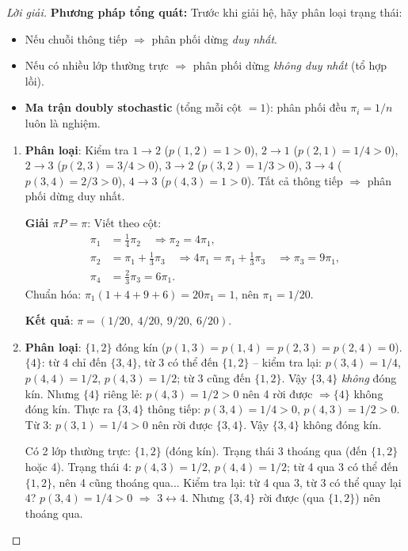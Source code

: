 \documentclass[8pt,a4paper]{article}
\newenvironment{solution}{\begin{proof}[Lời giải]}{\end{proof}}
\begin{document}
\begin{solution}
\textbf{Phương pháp tổng quát:} Trước khi giải hệ, hãy phân loại trạng thái:
\begin{itemize}
  \item Nếu chuỗi thông tiếp $\Rightarrow$ phân phối dừng \emph{duy nhất}.
  \item Nếu có nhiều lớp thường trực $\Rightarrow$ phân phối dừng \emph{không duy nhất} (tổ hợp lồi).
  \item \textbf{Ma trận doubly stochastic} (tổng mỗi cột $= 1$): phân phối đều $\pi_i = 1/n$ luôn là nghiệm.
\end{itemize}

\begin{enumerate}[label=(\alph*)]
\item \textbf{Phân loại}: Kiểm tra $1\to 2$ ($p(1,2)=1>0$), $2\to 1$ ($p(2,1)=1/4>0$), $2\to 3$ ($p(2,3)=3/4>0$), $3\to 2$ ($p(3,2)=1/3>0$), $3\to 4$ ($p(3,4)=2/3>0$), $4\to 3$ ($p(4,3)=1>0$). Tất cả thông tiếp $\Rightarrow$ phân phối dừng duy nhất.

\textbf{Giải $\pi P = \pi$}: Viết theo cột:
\begin{align*}
  \pi_1 &= \tfrac{1}{4}\pi_2 \quad \Rightarrow \pi_2 = 4\pi_1, \\
  \pi_2 &= \pi_1 + \tfrac{1}{3}\pi_3 \quad \Rightarrow 4\pi_1 = \pi_1 + \tfrac{1}{3}\pi_3 \quad \Rightarrow \pi_3 = 9\pi_1, \\
  \pi_4 &= \tfrac{2}{3}\pi_3 = 6\pi_1.
\end{align*}
Chuẩn hóa: $\pi_1(1+4+9+6) = 20\pi_1 = 1$, nên $\pi_1 = 1/20$.

\textbf{Kết quả}: $\pi = (1/20,\ 4/20,\ 9/20,\ 6/20)$.

\item \textbf{Phân loại}: $\{1,2\}$ đóng kín ($p(1,3)=p(1,4)=p(2,3)=p(2,4)=0$). $\{4\}$: từ 4 chỉ đến $\{3,4\}$, từ 3 có thể đến $\{1,2\}$ -- kiểm tra lại: $p(3,4)=1/4$, $p(4,4)=1/2$, $p(4,3)=1/2$; từ 3 cũng đến $\{1,2\}$. Vậy $\{3,4\}$ \emph{không} đóng kín. Nhưng $\{4\}$ riêng lẻ: $p(4,3)=1/2>0$ nên 4 rời được $\Rightarrow \{4\}$ không đóng kín. Thực ra $\{3,4\}$ thông tiếp: $p(3,4)=1/4>0$, $p(4,3)=1/2>0$. Từ 3: $p(3,1)=1/4>0$ nên rời được $\{3,4\}$. Vậy $\{3,4\}$ không đóng kín.

Có 2 lớp thường trực: $\{1,2\}$ (đóng kín). Trạng thái 3 thoáng qua (đến $\{1,2\}$ hoặc 4). Trạng thái 4: $p(4,3)=1/2$, $p(4,4)=1/2$; từ 4 qua 3 có thể đến $\{1,2\}$, nên 4 cũng thoáng qua... Kiểm tra lại: từ 4 qua 3, từ 3 có thể quay lại 4? $p(3,4)=1/4>0$ $\Rightarrow$ $3\leftrightarrow 4$. Nhưng $\{3,4\}$ rời được (qua $\{1,2\}$) nên thoáng qua.


\end{enumerate}
\end{solution}
\end{document}
